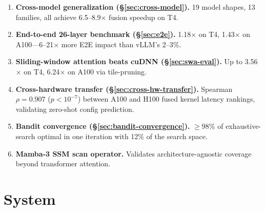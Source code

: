 \documentclass[11pt]{article}
\begin{document}
\begin{enumerate}[leftmargin=*,itemsep=2pt]
\item \textbf{Cross-model generalization (\S\ref{sec:cross-model}).} 19 model
shapes, 13 families, all achieve 6.5--8.9$\times$ fusion speedup on T4.

\item \textbf{End-to-end 26-layer benchmark (\S\ref{sec:e2e}).} 1.18$\times$ on
T4, 1.43$\times$ on A100---6--21$\times$ more E2E impact than vLLM's 2--3\%.

\item \textbf{Sliding-window attention beats cuDNN
(\S\ref{sec:swa-eval}).} Up to 3.56$\times$ on T4, 6.24$\times$ on A100 via
tile-pruning.

\item \textbf{Cross-hardware transfer (\S\ref{sec:cross-hw-transfer}).}
Spearman $\rho=0.907$ ($p<10^{-7}$) between A100 and H100 fused kernel latency
rankings, validating zero-shot config prediction.

\item \textbf{Bandit convergence (\S\ref{sec:bandit-convergence}).} $\geq$98\%
of exhaustive-search optimal in one iteration with 12\% of the search space.

\item \textbf{Mamba-3 SSM scan operator.} Validates architecture-agnostic
coverage beyond transformer attention.

\end{enumerate}


\section{System}
\label{sec:system}
\end{document}
